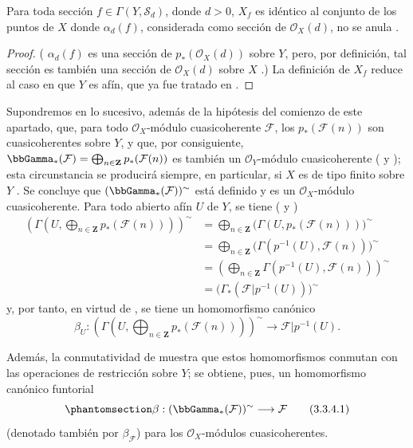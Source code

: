 \documentclass[oneside,10pt]{amsart}
\let\EGAOriginalLabel\label
\renewcommand{\label}[1]{\phantomsection\EGAOriginalLabel{#1}}
\begin{document}
\begin{proposition}[3.3.3]
\label{II.3.3.3-fr}
Para toda sección $f\in\Gamma(Y,\mathcal{S}_d)$, donde $d>0$, $X_f$ es idéntico al conjunto de los puntos de $X$ donde $\alpha_d(f)$, considerada como sección de $\mathcal{O}_X(d)$, no se anula .
\end{proposition}

\begin{proof}
( $\alpha_d(f)$ es una sección de $p_*(\mathcal{O}_X(d))$ sobre $Y$, pero, por definición, tal sección es también una sección de $\mathcal{O}_X(d)$ sobre $X$ .)
La definición de $X_f$  reduce al caso en que $Y$ es afín, que ya fue tratado en .
\end{proof}

\begin{env}[3.3.4]
\label{II.3.3.4-fr}
Supondremos en lo sucesivo, además de la hipótesis del comienzo de este apartado, que, para todo $\mathcal{O}_X$-módulo cuasicoherente $\mathcal{F}$, los $p_*(\mathcal{F}(n))$ son cuasicoherentes sobre $Y$, y que, por consiguiente, $\bbGamma_*(\mathcal{F})=\bigoplus_{n\in\mathbf{Z}}p_*(\mathcal{F}(n))$ es también un $\mathcal{O}_Y$-módulo cuasicoherente ( y ); esta circunstancia se producirá siempre, en particular, si $X$ es de tipo finito sobre $Y$ .
Se concluye que $(\bbGamma_*(\mathcal{F}))^{\sim}$ está definido y es un $\mathcal{O}_X$-módulo cuasicoherente.
Para todo abierto afín $U$ de $Y$, se tiene ( y )
\begin{align*}
  \left(\Gamma\left(U,\bigoplus_{n\in\mathbf{Z}}
  p_*(\mathcal{F}(n))\right)\right)^{\sim}
  &=\bigoplus_{n\in\mathbf{Z}}
  \bigl(\Gamma(U,p_*(\mathcal{F}(n)))\bigr)^{\sim}\\
  &=\bigoplus_{n\in\mathbf{Z}}
  \bigl(\Gamma(p^{-1}(U),\mathcal{F}(n))\bigr)^{\sim}\\
  &=\left(\bigoplus_{n\in\mathbf{Z}}
  \Gamma(p^{-1}(U),\mathcal{F}(n))\right)^{\sim}\\
  &=\bigl(\Gamma_*(\mathcal{F}|p^{-1}(U))\bigr)^{\sim}
\end{align*}
y, por tanto, en virtud de , se tiene un homomorfismo canónico
\[
  \beta_U:\left(\Gamma\left(U,\bigoplus_{n\in\mathbf{Z}}
  p_*(\mathcal{F}(n))\right)\right)^{\sim}
  \longrightarrow\mathcal{F}|p^{-1}(U).
\]

Además, la conmutatividad de  muestra que estos homomorfismos conmutan con las operaciones de restricción sobre $Y$; se obtiene, pues, un homomorfismo canónico funtorial
\[
\label{II.3.3.4.1-fr}
  \beta:(\bbGamma_*(\mathcal{F}))^{\sim}\longrightarrow\mathcal{F}
\tag{3.3.4.1}
\]
(denotado también por $\beta_{\mathcal{F}}$) para los $\mathcal{O}_X$-módulos cuasicoherentes.
\end{env}
\end{document}

